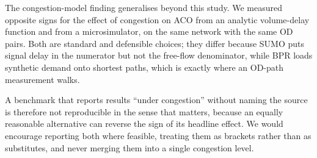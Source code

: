 The congestion-model finding generalises beyond this study. We measured
opposite signs for the effect of congestion on ACO from an analytic
volume-delay function and from a microsimulator, on the same network with the
same OD pairs. Both are standard and defensible choices; they differ because
SUMO puts signal delay in the numerator but not the free-flow denominator,
while BPR loads synthetic demand onto shortest paths, which is exactly where
an OD-path measurement walks.

A benchmark that reports results ``under congestion'' without naming the
source is therefore not reproducible in the sense that matters, because an
equally reasonable alternative can reverse the sign of its headline effect.
We would encourage reporting both where feasible, treating them as brackets
rather than as substitutes, and never merging them into a single congestion
level.

